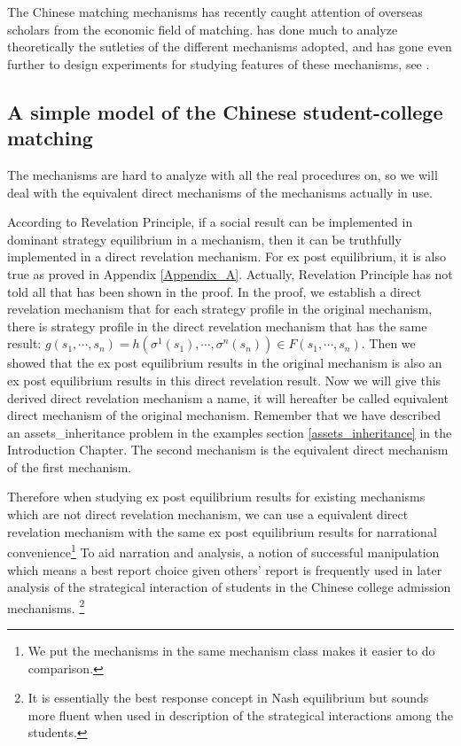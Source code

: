 The Chinese  matching mechanisms has recently caught attention of overseas scholars from
the economic field of matching. \parencite{YanChenJPE} has
done much to analyze theoretically the sutleties of the different
mechanisms adopted, and has gone even further to design experiments
for studying features of these mechanisms,
see \parencite{YanChen2016}. 

\subsection{A simple model of the Chinese student-college matching}

The mechanisms are hard to analyze with all the real procedures on,
so we will deal with the equivalent direct mechanisms of the mechanisms actually in use.

According to Revelation  Principle,  if a social result can be
implemented in dominant strategy equilibrium in a mechanism, then it
can be truthfully implemented in a direct revelation mechanism. For ex post equilibrium,
it is also true as proved in Appendix \ref{Appendix_A}. Actually, Revelation Principle
has not told all that has been shown in the proof. In the proof, we establish a direct revelation mechanism that
for each strategy profile in the original mechanism, there is strategy profile in the direct revelation mechanism that has the same
result: $g(s_1,\cdots,s_n)=h(\sigma^1(s_1),\cdots,\sigma^n(s_n))\in F(s_1,\cdots,s_n)$. Then we showed that the ex post equilibrium results in the
original mechanism is also an ex post equilibrium results in this direct revelation result. Now we will give this derived direct revelation mechanism a name, it will hereafter be called equivalent direct mechanism of the original mechanism. Remember that we have described an assets_inheritance problem in the examples section \ref{assets_inheritance} in the Introduction Chapter. The second mechanism is the equivalent direct mechanism of the first mechanism. 

Therefore when studying ex post equilibrium results for existing mechanisms which are not direct revelation mechanism,
we can use a equivalent direct revelation mechanism with the same ex post equilibrium results for narrational convenience\footnote{We put the mechanisms in the same mechanism class makes it easier to do comparison.}  To aid narration and analysis,  a notion of
successful manipulation  which means a best report choice given others' report  is frequently used in later analysis of the strategical interaction of students in the Chinese college admission mechanisms. \footnote{ It is essentially the best response concept in Nash equilibrium but sounds more fluent when used
in description of the strategical interactions among the students.}

